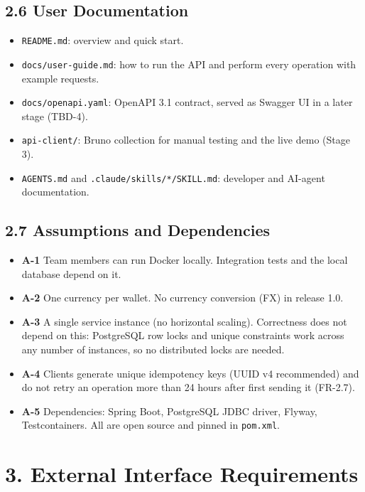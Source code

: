 \documentclass[11pt,a4paper]{article}
\providecommand{\tightlist}{\setlength{\itemsep}{2pt}\setlength{\parskip}{0pt}}
\begin{document}
\subsection{2.6 User Documentation}\label{user-documentation}

\begin{itemize}
\tightlist
\item
  \texttt{README.md}: overview and quick start.
\item
  \texttt{docs/\allowbreak{}user-guide.md}: how to run the API and perform every operation with example requests.
\item
  \texttt{docs/\allowbreak{}openapi.yaml}: OpenAPI 3.1 contract, served as Swagger UI in a later stage (TBD-4).
\item
  \texttt{api-client/\allowbreak{}}: Bruno collection for manual testing and the live demo (Stage 3).
\item
  \texttt{AGENTS.md} and \texttt{.claude/\allowbreak{}skills/\allowbreak{}*/\allowbreak{}SKILL.md}: developer and AI-agent documentation.
\end{itemize}

\subsection{2.7 Assumptions and Dependencies}\label{assumptions-and-dependencies}

\begin{itemize}
\tightlist
\item
  \textbf{A-1} Team members can run Docker locally. Integration tests and the local database depend on
  it.
\item
  \textbf{A-2} One currency per wallet. No currency conversion (FX) in release 1.0.
\item
  \textbf{A-3} A single service instance (no horizontal scaling). Correctness does not depend on this:
  PostgreSQL row locks and unique constraints work across any number of instances, so no
  distributed locks are needed.
\item
  \textbf{A-4} Clients generate unique idempotency keys (UUID v4 recommended) and do not retry an
  operation more than 24 hours after first sending it (FR-2.7).
\item
  \textbf{A-5} Dependencies: Spring Boot, PostgreSQL JDBC driver, Flyway, Testcontainers. All are open
  source and pinned in \texttt{pom.xml}.
\end{itemize}

\section{3. External Interface Requirements}\label{external-interface-requirements}
\end{document}
